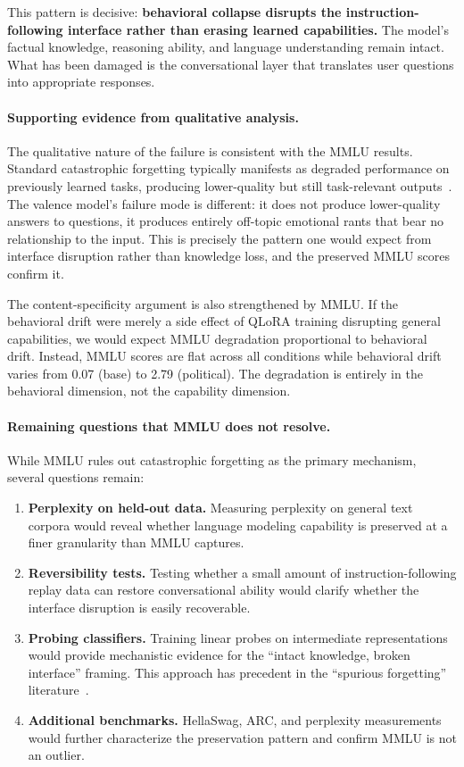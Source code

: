 \documentclass{article}
\begin{document}
This pattern is decisive: \textbf{behavioral collapse disrupts the
instruction-following interface rather than erasing learned capabilities.} The
model's factual knowledge, reasoning ability, and language understanding remain
intact. What has been damaged is the conversational layer that translates user
questions into appropriate responses.

\paragraph{Supporting evidence from qualitative analysis.}
The qualitative nature of the failure is consistent with the MMLU results.
Standard catastrophic forgetting typically manifests as degraded performance on
previously learned tasks, producing lower-quality but still task-relevant
outputs~\citep{luo2023forgetting,haque2025catastrophic}. The valence model's
failure mode is different: it does not produce lower-quality answers to
questions, it produces entirely off-topic emotional rants that bear no
relationship to the input. This is precisely the pattern one would expect from
interface disruption rather than knowledge loss, and the preserved MMLU scores
confirm it.

The content-specificity argument is also strengthened by MMLU. If the
behavioral drift were merely a side effect of QLoRA training disrupting general
capabilities, we would expect MMLU degradation proportional to behavioral
drift. Instead, MMLU scores are flat across all conditions while behavioral
drift varies from 0.07 (base) to 2.79 (political). The degradation is entirely
in the behavioral dimension, not the capability dimension.

\paragraph{Remaining questions that MMLU does not resolve.}
While MMLU rules out catastrophic forgetting as the primary mechanism, several
questions remain:

\begin{enumerate}[leftmargin=*,itemsep=2pt]
  \item \textbf{Perplexity on held-out data.} Measuring perplexity on general
    text corpora would reveal whether language modeling capability is preserved
    at a finer granularity than MMLU captures.
  \item \textbf{Reversibility tests.} Testing whether a small amount of
    instruction-following replay data can restore conversational ability would
    clarify whether the interface disruption is easily recoverable.
  \item \textbf{Probing classifiers.} Training linear probes on intermediate
    representations would provide mechanistic evidence for the ``intact
    knowledge, broken interface'' framing. This approach has precedent in the
    ``spurious forgetting'' literature~\citep{ramasesh2022scale}.
  \item \textbf{Additional benchmarks.} HellaSwag, ARC, and perplexity
    measurements would further characterize the preservation pattern and confirm
    MMLU is not an outlier.
\end{enumerate}
\end{document}
